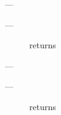 \returns
\begin{description}
    \item[---] \this
\end{description}

\postcond
\begin{description}
    \item[---] \emptyfn returns \true
\end{description}


\mandates
\begin{description}
    \item[---] 
\end{description}

\precond
\begin{description}
    \item[---] \canresume returns \true
\end{description}

\newcommand{\continuation}{\cpp{continuation}}

